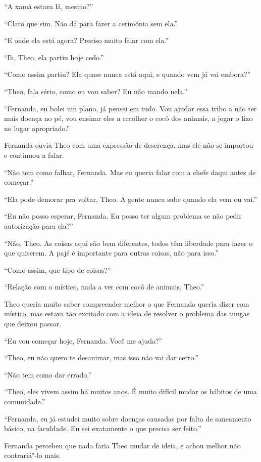 ``A xamã estava lá, mesmo?''

``Claro que sim. Não dá para fazer a cerimônia sem ela.''

``E onde ela está agora? Preciso muito falar com ela.''

``Ih, Theo, ela partiu hoje cedo.''

``Como assim partiu? Ela quase nunca está aqui, e quando vem já vai
embora?''

``Theo, fala sério, como eu vou saber? Eu não mando nela.''

``Fernanda, eu bolei um plano, já pensei em tudo. Vou ajudar essa tribo
a não ter mais doença no pé, vou ensinar eles a recolher o cocô dos
animais, a jogar o lixo no lugar apropriado.''

Fernanda ouvia Theo com uma expressão de descrença, mas ele não se
importou e continuou a falar.

``Não tem como falhar, Fernanda. Mas eu queria falar com a chefe daqui
antes de começar.''

``Ela pode demorar pra voltar, Theo. A gente nunca sabe quando ela vem
ou vai.''

``Eu não posso esperar, Fernanda. Eu posso ter algum problema se não
pedir autorização para ela?''

``Não, Theo. As coisas aqui são bem diferentes, todos têm liberdade para
fazer o que quiserem. A pajé é importante para outras coisas, não para
isso.''

``Como assim, que tipo de coisas?''

``Relação com o místico, nada a ver com cocô de animais, Theo.''

Theo queria muito saber compreender melhor o que Fernanda queria dizer
com místico, mas estava tão excitado com a ideia de resolver o problema
das tungas que deixou passar.

``Eu vou começar hoje, Fernanda. Você me ajuda?''

``Theo, eu não quero te desanimar, mas isso não vai dar certo.''

``Não tem como dar errado.''

``Theo, eles vivem assim há muitos anos. É muito difícil mudar os
hábitos de uma comunidade.''

``Fernanda, eu já estudei muito sobre doenças causadas por falta de
saneamento básico, na faculdade. Eu sei exatamente o que precisa ser
feito.''

Fernanda percebeu que nada faria Theo mudar de ideia, e achou melhor não
contrariá"-lo mais.


